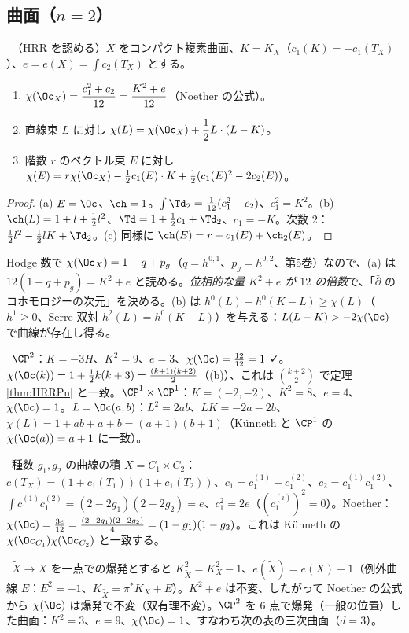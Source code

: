 \subsection{曲面（$n=2$）}
\begin{thm}\label{thm:Noether}\tP\ （HRR を認める）$X$ をコンパクト複素曲面、$K=K_X$（$c_1(K)=-c_1(T_X)$）、$e=e(X)=\int c_2(T_X)$ とする。
\begin{enumerate}[label=(\alph*)]
\item $\chi(\Oc_X)=\dfrac{c_1^2+c_2}{12}=\dfrac{K^2+e}{12}$（Noether の公式）。
\item 直線束 $L$ に対し $\chi(L)=\chi(\Oc_X)+\dfrac12L\cdot(L-K)$。
\item 階数 $r$ のベクトル束 $E$ に対し $\chi(E)=r\chi(\Oc_X)-\frac12c_1(E)\cdot K+\frac12(c_1(E)^2-2c_2(E))$。
\end{enumerate}
\end{thm}
\begin{proof}
(a) $E=\Oc$、$\ch=1$。$\int\Td_2=\frac1{12}(c_1^2+c_2)$、$c_1^2=K^2$。(b) $\ch(L)=1+l+\frac12l^2$、$\Td=1+\frac12c_1+\Td_2$、$c_1=-K$。次数 $2$：$\frac12l^2-\frac12lK+\Td_2$。(c) 同様に $\ch(E)=r+c_1(E)+\ch_2(E)$。
\end{proof}
\noindent Hodge 数で $\chi(\Oc_X)=1-q+p_g$（$q=h^{0,1}$、$p_g=h^{0,2}$、第5巻）なので、(a) は $12(1-q+p_g)=K^2+e$ と読める。\emph{位相的な量 $K^2+e$ が $12$ の倍数}で、「$\bar\partial$ のコホモロジーの次元」を決める。(b) は $h^0(L)+h^0(K-L)\ge\chi(L)$（$h^1\ge0$、Serre 双対 $h^2(L)=h^0(K-L)$）を与える：$L(L-K)>-2\chi(\Oc)$ で曲線が存在し得る。

\begin{ex}[$\CP^2$ と $\CP^1\times\CP^1$]\label{ex:basicsurf}\tP\
$\CP^2$：$K=-3H$、$K^2=9$、$e=3$、$\chi(\Oc)=\frac{12}{12}=1$ ✓。$\chi(\Oc(k))=1+\frac12k(k+3)=\frac{(k+1)(k+2)}2$（(b)）、これは $\binom{k+2}2$ で定理 \ref{thm:HRRPn} と一致。$\CP^1\times\CP^1$：$K=(-2,-2)$、$K^2=8$、$e=4$、$\chi(\Oc)=1$。$L=\Oc(a,b)$：$L^2=2ab$、$LK=-2a-2b$、$\chi(L)=1+ab+a+b=(a+1)(b+1)$（Künneth と $\CP^1$ の $\chi(\Oc(a))=a+1$ に一致）。
\end{ex}
\begin{ex}[曲線の積]\label{ex:prodcurve}\tP\
種数 $g_1,g_2$ の曲線の積 $X=C_1\times C_2$：$c(T_X)=(1+c_1(T_1))(1+c_1(T_2))$、$c_1=c_1^{(1)}+c_1^{(2)}$、$c_2=c_1^{(1)}c_1^{(2)}$、$\int c_1^{(1)}c_1^{(2)}=(2-2g_1)(2-2g_2)=e$、$c_1^2=2e$（$(c_1^{(i)})^2=0$）。Noether：$\chi(\Oc)=\frac{3e}{12}=\frac{(2-2g_1)(2-2g_2)}4=(1-g_1)(1-g_2)$。これは Künneth の $\chi(\Oc_{C_1})\chi(\Oc_{C_2})$ と一致する。
\end{ex}
\begin{ex}[爆発]\label{ex:blowup}\tC\
$\tilde X\to X$ を一点での爆発とすると $K_{\tilde X}^2=K_X^2-1$、$e(\tilde X)=e(X)+1$（例外曲線 $E$：$E^2=-1$、$K_{\tilde X}=\pi^*K_X+E$）。$K^2+e$ は不変、したがって Noether の公式から $\chi(\Oc)$ は爆発で不変（双有理不変）。$\CP^2$ を $6$ 点で爆発（一般の位置）した曲面：$K^2=3$、$e=9$、$\chi(\Oc)=1$、すなわち次の表の三次曲面（$d=3$）。
\end{ex}

